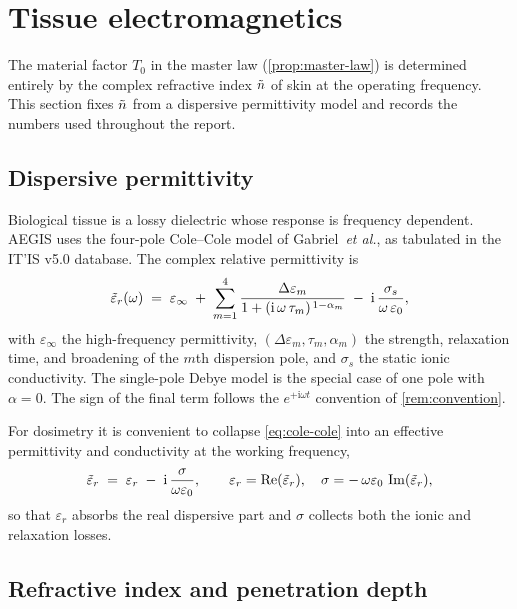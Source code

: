 \section{Tissue electromagnetics}\label{sec:tissue}

The material factor $T_0$ in the master law (\cref{prop:master-law}) is
determined entirely by the complex refractive index $\tilde{n}$ of skin at the
operating frequency. This section fixes $\tilde{n}$ from a dispersive
permittivity model and records the numbers used throughout the report.

\subsection{Dispersive permittivity}\label{sec:permittivity}

Biological tissue is a lossy dielectric whose response is frequency dependent.
AEGIS uses the four-pole Cole--Cole model of Gabriel~\textit{et al.}, as
tabulated in the IT'IS v5.0 database. The complex relative permittivity is
\begin{equation}\label{eq:cole-cole}
  \tilde{\varepsilon}_r(\omega) \;=\; \varepsilon_\infty
  \;+\; \sum_{m=1}^{4}\frac{\Delta\varepsilon_m}
       {1+(\mathrm{i}\,\omega\,\tau_m)^{\,1-\alpha_m}}
  \;-\; \mathrm{i}\,\frac{\sigma_s}{\omega\,\varepsilon_0},
\end{equation}
with $\varepsilon_\infty$ the high-frequency permittivity, $(\Delta\varepsilon_m,
\tau_m,\alpha_m)$ the strength, relaxation time, and broadening of the $m$th
dispersion pole, and $\sigma_s$ the static ionic conductivity. The single-pole
Debye model is the special case of one pole with $\alpha=0$. The sign of the
final term follows the $e^{+\mathrm{i}\omega t}$ convention of
\cref{rem:convention}.

For dosimetry it is convenient to collapse \cref{eq:cole-cole} into an effective
permittivity and conductivity at the working frequency,
\begin{equation}\label{eq:eps-eff}
  \tilde{\varepsilon}_r \;=\; \varepsilon_r \;-\; \mathrm{i}\,\frac{\sigma}{\omega\varepsilon_0},
  \qquad
  \varepsilon_r = \operatorname{Re}(\tilde{\varepsilon}_r), \quad
  \sigma = -\,\omega\varepsilon_0\,\operatorname{Im}(\tilde{\varepsilon}_r),
\end{equation}
so that $\varepsilon_r$ absorbs the real dispersive part and $\sigma$ collects
both the ionic and relaxation losses.

\subsection{Refractive index and penetration depth}\label{sec:n-and-delta}

